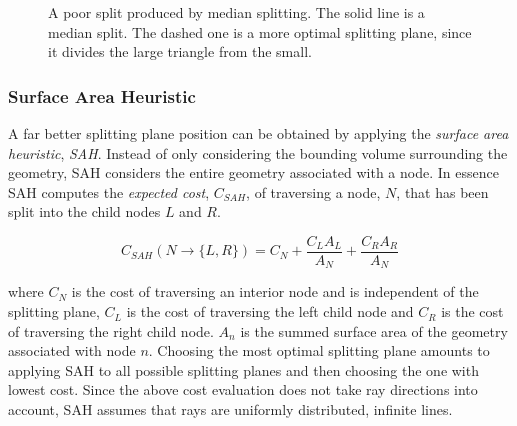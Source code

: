 \begin{figure}
  \centering

  \vspace{3mm}
  \parbox{5cm}{\caption[A poor split produced by median splitting.]{A poor split
      produced by median splitting. The solid line is a median split. The dashed
      one is a more optimal splitting plane, since it divides the large triangle
      from the small.}\label{fig:crapMedian}}
\end{figure}

\subsubsection{Surface Area Heuristic}\label{sec:SAH}


A far better splitting plane position can be obtained by applying the
\textit{surface area heuristic}, \textit{SAH}. Instead of only considering the
bounding volume surrounding the geometry, SAH considers the entire geometry
associated with a node. In essence SAH computes the \textit{expected cost},
$C_{SAH}$, of traversing a node, $N$, that has been split into the child nodes
$L$ and $R$.

\begin{displaymath}
  C_{SAH}(N \rightarrow \{L, R\}) = C_N + \frac{C_L A_L}{A_N} +
  \frac{C_R A_R}{A_N}
\end{displaymath}

where $C_N$ is the cost of traversing an interior node and is independent of the
splitting plane, $C_L$ is the cost of traversing the left child node and $C_R$
is the cost of traversing the right child node. $A_n$ is the summed surface area
of the geometry associated with node $n$. Choosing the most optimal splitting
plane amounts to applying SAH to all possible splitting planes and then choosing
the one with lowest cost. Since the above cost evaluation does not take ray
directions into account, SAH assumes that rays are uniformly distributed,
infinite lines.

